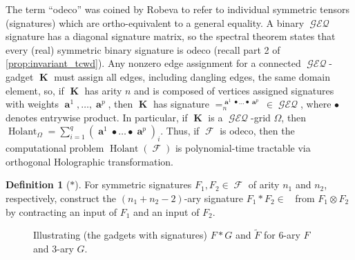 \documentclass{article}
\theoremstyle{remark}
\theoremstyle{definition}
\newtheorem{definition}{Definition}[section]
\DeclareMathOperator{\vk}{\mathbf{K}}
\DeclareMathOperator{\va}{\mathbf{a}}
\DeclareMathOperator{\fc}{\mathcal{F}}
\DeclareMathOperator{\ofc}{\overline{\fc}}
\DeclareMathOperator{\holant}{Holant}
\DeclareMathOperator{\geneq}{\mathcal{GEQ}}
\begin{document}
The term ``odeco'' was coined by Robeva \cite{robeva} to refer to individual symmetric tensors
(signatures) which are ortho-equivalent to a general equality. A binary $\geneq$ signature has a
diagonal signature matrix, so the spectral theorem states that every (real) symmetric binary 
signature is odeco
(recall part 2 of \autoref{prop:invariant_tcwd}).
Any nonzero edge assignment for a connected $\geneq$-gadget $\vk$ must assign all edges, including 
dangling edges, the same domain element, so, if $\vk$ has arity $n$ and is composed of vertices assigned signatures with 
weights $\va^1,\ldots,\va^p$, then $\vk$ has signature $=_n^{\va^1 \bullet \ldots \bullet \va^p} \in \geneq$, where $\bullet$ denotes entrywise product.
In particular, if $\vk$ is a $\geneq$-grid $\Omega$, then
$\holant_\Omega = \sum_{i=1}^q (\va^1 \bullet \ldots \bullet \va^p)_i$. Thus, if 
$\fc$ is odeco, then the computational problem $\holant(\fc)$ is polynomial-time tractable via
orthogonal Holographic transformation.
\begin{definition}[$*$]
    For symmetric signatures $F_1,F_2 \in \fc$ of arity $n_1$ and $n_2$, respectively, 
    construct the $(n_1+n_2-2)$-ary signature $F_1 * F_2 \in \ofc$ from $F_1 \otimes F_2$
    by contracting an input of $F_1$ and an input of $F_2$.
\end{definition}
\begin{figure}[ht!]
    \centering
     \caption{Illustrating (the gadgets with signatures) $F * G$ and $\widetilde{F}$ for 6-ary $F$ and 3-ary $G$.}
    \label{fig:star_tilde}
\end{figure}
\end{document}

